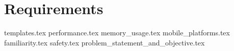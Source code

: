 \chapter{Requirements}
\label{chap:requirements}

{templates.tex}
{performance.tex}
{memory_usage.tex}
{mobile_platforms.tex}
{familiarity.tex}
{safety.tex}
{problem_statement_and_objective.tex}
